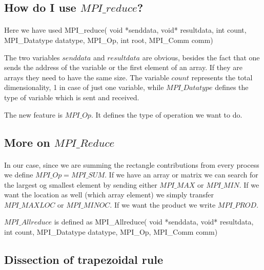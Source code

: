 \documentclass[%
oneside,                 %
final,                   %
10pt]{article}
\begin{document}
\subsection{How do I use $MPI\_reduce$?}

\paragraph{}

Here we have used
\bcppcod
MPI_reduce( void *senddata, void* resultdata, int count, 
     MPI_Datatype datatype, MPI_Op, int root, MPI_Comm comm)
\ecppcod

The two variables $senddata$ and $resultdata$ are obvious, besides the fact that one sends the address
of the variable or the first element of an array.  If they are arrays they need to have the same size. 
The variable $count$ represents the total dimensionality, 1 in case of just one variable, 
while $MPI\_Datatype$ 
defines the type of variable which is sent and received.  

The new feature is $MPI\_Op$. It defines the type
of operation we want to do.



\subsection{More on $MPI\_Reduce$}

\paragraph{}
In our case, since we are summing
the rectangle  contributions from every process we define  $MPI\_Op = MPI\_SUM$.
If we have an array or matrix we can search for the largest og smallest element by sending either $MPI\_MAX$ or 
$MPI\_MIN$.  If we want the location as well (which array element) we simply transfer 
$MPI\_MAXLOC$ or $MPI\_MINOC$. If we want the product we write $MPI\_PROD$. 

$MPI\_Allreduce$ is defined as
\bcppcod
MPI_Allreduce( void *senddata, void* resultdata, int count, 
          MPI_Datatype datatype, MPI_Op, MPI_Comm comm)        
\ecppcod



\subsection{Dissection of trapezoidal rule}
\end{document}
